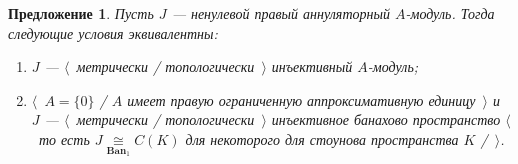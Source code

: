 \documentclass[12pt]{article}
\newcommand{\isom}[1]{\mathop{\mathbin{\cong}}\limits_{#1}}
\newtheorem{proposition}[theorem]{Предложение}
\begin{document}
\begin{proposition}\label{MetTopInjOfAnnihModCharac} Пусть $J$ --- ненулевой
    правый аннуляторный $A$-модуль. Тогда следующие условия эквивалентны:
    \begin{enumerate}[label = (\roman*)]
        \item $J$ --- $\langle$~метрически / топологически~$\rangle$ инъективный
              $A$-модуль;

        \item $\langle$~$A= \{0 \}$ / $A$ имеет правую ограниченную
              аппроксимативную единицу~$\rangle$ и 
              $J$ ---  $\langle$~метрически / топологически~$\rangle$ 
              инъективное банахово пространство 
              $\langle$~то есть $J\isom{\mathbf{Ban}_1}C(K)$ 
              для некоторого для стоунова пространства $K$ /~$\rangle$.
    \end{enumerate}

\end{proposition}
\end{document}
